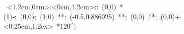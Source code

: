 %


\hbox{
\xy    <1.2cm,0cm>:<0cm,1.2cm>::
       (0,0) *\ellipse(1){-}; (0,0); 
       (1,0) **\dir{-}; (-0.5,0.886025) **\dir{-}; 
       (0,0) **\dir{-};
       (0,0)+<0.25em,1.2ex> *{120^\circ};
\endxy}

